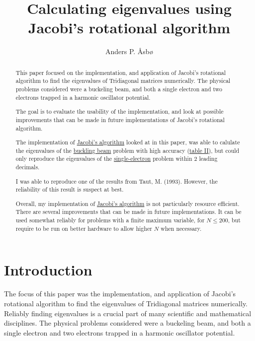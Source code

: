 \documentclass[english,notitlepage,reprint]{revtex4-1}  %
\begin{document}
\title{Calculating eigenvalues using Jacobi's rotational algorithm}   %
\author{Anders P. Åsbø}               %

\date{}
\noaffiliation                            %

\begin{abstract}
This paper focused on the implementation, and application of Jacobi's rotational algorithm to find the eigenvalues of Tridiagonal matrices numerically. The physical problems considered were a buckeling beam, and both a single electron and two electrons trapped in a harmonic oscillator potential.

The goal is to evaluate the usability of the implementation, and look at possible improvements that can be made in future implementations of Jacobi's rotational algorithm.

The implementation of \hyperref[subsec:32]{Jacobi's algorithm} looked at in this paper, was able to calulate the eigenvalues of the \hyperref[subsec:21]{buckling beam} problem with high accuracy (\hyperref[tab:421]{table II}), but could only reproduce the eigenvalues of the \hyperref[subsec:23]{single-electron} problem within \(2\) leading decimals.

I was able to reproduce one of the results from Taut, M. (1993)\citep{PhysRevA.48.3561}. However, the reliability of this result is suspect at best.

Overall, my implementation of \hyperref[subsec:32]{Jacobi's algorithm} is not particularly resource efficient. There are several improvements that can be made in future implementations. It can be used somewhat reliably for problems with a finite maximum variable, for \(N \leq 200\), but require to be run on better hardware to allow higher \(N\) when necessary.
\end{abstract}

\maketitle
\tableofcontents

\section{Introduction}\label{sec:1}
The focus of this paper was the implementation, and application of Jacobi's rotational algorithm to find the eigenvalues of Tridiagonal matrices numerically. Reliably finding eigenvalues is a crucial part of many scientific and mathematical disciplines. The physical problems considered were a buckeling beam, and both a single electron and two electrons trapped in a harmonic oscillator potential.
\end{document}
